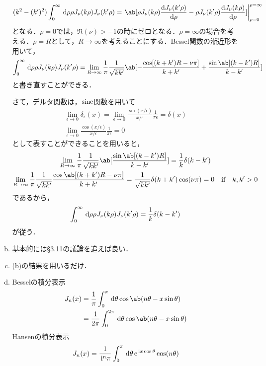 \begin{enumerate}[label=\fbox{\textbf{\thesection.\arabic*}}]
\begin{enumerate}[(a)]
        \begin{gather}
          (k^2 - (k')^2) \int_0^\infty \dl{\rho}\rho J_\nu(k\rho)J_\nu(k'\rho) = \eval{\ab[\rho J_\nu(k\rho)\diff{J_\nu(k'\rho)}{\rho} - \rho J_\nu(k'\rho)\diff{J_\nu(k\rho)}{\rho}]}_{\rho=0}^{\rho=\infty}
        \end{gather}
        となる．$\rho = 0$では，$\Re (\nu) > -1$の時にゼロとなる．$\rho = \infty$の場合を考える．$\rho = R$として，$R \to \infty$を考えることにする．Bessel関数の漸近形を用いて，
        \begin{gather}  
          \int_0^\infty \dl{\rho}\rho J_\nu(k\rho) J_\nu(k' \rho) 
          = \lim_{R\to \infty}\frac{1}{\pi}\frac{1}{\sqrt{kk'}} \ab[-\frac{\cos[(k+k')R - \nu \pi]}{k+k'} + \frac{\sin\ab[(k-k')R]}{k-k'}]
        \end{gather}
        と書き直すことができる．

        さて，デルタ関数は，$\operatorname{sinc}$関数を用いて
        \begin{gather}
          \lim_{\epsilon \to 0} \delta_\epsilon(x) = \lim_{\epsilon \to 0} \frac{\sin(x/\epsilon)}{x / \epsilon} \frac{1}{\pi \epsilon} = \delta(x)\\
          \lim_{\epsilon \to 0} \frac{\cos(x/\epsilon)}{x/\epsilon} \frac{1}{\pi \epsilon} = 0
        \end{gather}
        として表すことができることを用いると，
        \begin{gather}
          \lim_{R\to \infty} \frac{1}{\pi}\frac{1}{\sqrt{kk'}}\ab[\frac{\sin\ab[(k-k')R]}{k-k'}]  = \frac{1}{k}\delta(k-k')\\
          \lim_{R \to \infty} \frac{1}{\pi} \frac{1}{\sqrt{kk'}} \frac{\cos\ab[(k+k')R - \nu \pi]}{k+k'} = \frac{1}{\sqrt{kk'}} \delta(k+k')\cos(\nu \pi) = 0 \qq \text{if}\qq k, k'>0
        \end{gather}
        であるから，
        \begin{gather}
          \int_0^\infty \dl{\rho}\rho J_\nu(k\rho) J_\nu(k' \rho) = \frac{1}{k}\delta(k-k')
        \end{gather}
        が従う．
      \item 基本的には§3.11の議論を追えば良い．
      \item (b)の結果を用いるだけ．
      \item Besselの積分表示
        \begin{align}
          J_n(x) &= \frac{1}{\pi} \int_0^\pi \dl{\theta}\cos\ab(n\theta - x \sin\theta)\\
                 &=  \frac{1}{2\pi} \int_0^{2\pi} \dl{\theta} \cos\ab(n \theta - x \sin\theta)
        \end{align}
        Hansenの積分表示
        \begin{gather}
          J_n(x) = \frac{1}{\i^n \pi} \int_0^\pi \dl{\theta} \e^{\i x \cos\theta} \cos (n\theta)
        \end{gather}
    \end{enumerate}


\end{enumerate}

